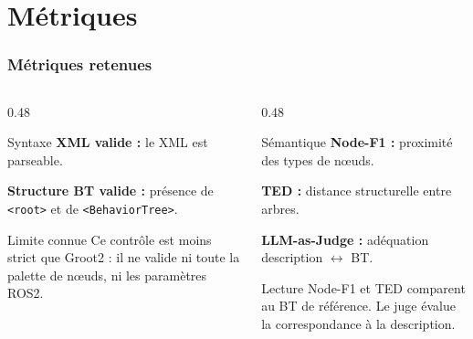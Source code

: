 \documentclass[aspectratio=169]{beamer}
\begin{document}
\section{Métriques}

\begin{frame}
  \frametitle{Métriques retenues}

  \begin{columns}[T]
    \begin{column}{0.48\textwidth}
      \begin{block}{Syntaxe}
        \small
        \textbf{XML valide :} le XML est parseable.

        \vspace{0.4em}
        \textbf{Structure BT valide :} présence de \texttt{<root>} et de \texttt{<BehaviorTree>}.
      \end{block}

      \begin{alertblock}{Limite connue}
        \small
        Ce contrôle est moins strict que Groot2 : il ne valide ni toute la palette de nœuds, ni les paramètres ROS2.
      \end{alertblock}
    \end{column}
    \begin{column}{0.48\textwidth}
      \begin{block}{Sémantique}
        \small
        \textbf{Node-F1 :} proximité des types de nœuds.

        \vspace{0.4em}
        \textbf{TED :} distance structurelle entre arbres.

        \vspace{0.4em}
        \textbf{LLM-as-Judge :} adéquation description $\leftrightarrow$ BT.
      \end{block}

      \begin{exampleblock}{Lecture}
        \small
        Node-F1 et TED comparent au BT de référence. Le juge évalue la correspondance à la description.
      \end{exampleblock}
    \end{column}
  \end{columns}
\end{frame}
\end{document}

